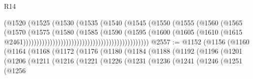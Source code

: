 \begin{lexlean}{R14}
\begin{coremodule}
{{{{{{{{{{{{{{{{{{{{{{{{{{{{{{{{{{{{{{{{{{{{{{{{{{{{{{{{{{{{{{{{{{{{{{{{{{{{{{{{{{{{{{{{{{{{{{{{{{{{{{{{{{                                                          (@1520
                                                            (@1525
                                                              (@1530
                                                                (@1535
                                                                  (@1540
                                                                    (@1545
                                                                      (@1550
                                                                        (@1555
                                                                          (@1560
                                                                            (@1565
                                                                              (@1570
                                                                                (@1575
                                                                                  (@1580
                                                                                    (@1585
                                                                                      (@1590
                                                                                        (@1595
                                                                                          (@1600
                                                                                            (@1605
                                                                                              (@1610
                                                                                                (@1615
                                                                                                  @2461)))))))))))))))))))))))))))))))))))))))))))))))
@2557 := @1152
    (@1156
      (@1160
        (@1164
          (@1168
            (@1172
              (@1176
                (@1180
                  (@1184
                    (@1188
                      (@1192
                        (@1196
                          (@1201
                            (@1206
                              (@1211
                                (@1216
                                  (@1221
                                    (@1226
                                      (@1231
                                        (@1236
                                          (@1241
                                            (@1246
                                              (@1251
                                                (@1256
}}}}}}}}}}}}}}}}}}}}}}}}}}}}}}}}}}}}}}}}}}}}}}}}}}}}}}}}}}}}}}}}}}}}}}}}}}}}}}}}}}}}}}}}}}}}}}}}}}}}}}}}}}
\end{coremodule}
\end{lexlean}
